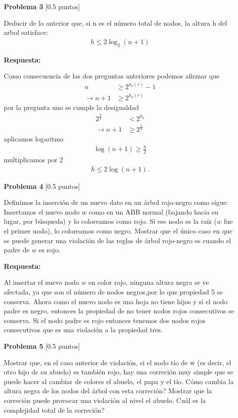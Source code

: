 \documentclass[11pt]{article}
\begin{document}
\begin{itemize}
 \item [\textbf{Problema 3}] [0.5 puntos]

Deducir de lo anterior que, si n es el número total de nodos, la altura h del arbol satisface:
\begin{align*}
h\leq2\log_2(n+1)
\end{align*}

\textbf{Respuesta:}

Como consecuencia de las dos preguntas anteriores podemos afirmar que
\begin{align*}
   n&\geq2^{h_b(r)}-1
  \\ \xrightarrow{}  n+1&\geq2^{h_b(r)}
\end{align*}
 por la pregunta uno se cumple la desigualdad
\begin{align*}
    2^{\frac{h}{2}}&<2^{h_b} 
   \\ \xrightarrow{} n+1&\geq 2^{\frac{h}{2}}
\end{align*}
aplicamos logaritmo
\begin{align*}
\log(n+1)\geq \frac{h}{2}
\end{align*}
multiplicamos por 2
\begin{align*}
h\leq 2 \log(n+1).
\end{align*}

\item [\textbf{Problema 4}] [0.5 puntos]

Definimos la inserción de un nuevo dato en un árbol rojo-negro como sigue: Insertamos el nuevo nodo
$w$ como en un ABB normal (bajando hacia su lugar, por búsqueda) y lo coloreamos como rojo. Si
ese nodo es la raíz ($w$ fue el primer nodo), lo coloreamos como negro. Mostrar que el único caso en
que se puede generar una violación de las reglas de árbol rojo-negro es cuando el padre de $w$ es rojo.

\textbf{Respuesta:}

Al insertar el nuevo nodo $w$ en color rojo, ninguna altura negra se ve afectada, ya que son el número de nodos negros,por lo que propiedad 5 se conserva. Ahora como el nuevo nodo es una hoja no tiene hijos y si el nodo padre es negro, entonces la propiedad de no tener nodos rojos consecutivos se conserva. Si el nodo padre es rojo entonces tenemos dos nodos rojos consecutivos que es una violación a la propiedad tres.

\item [\textbf{Problema 5}] [0.5 puntos]

 Mostrar que, en el caso anterior de violación, si el nodo tío de w (es decir, el otro hijo de su abuelo)
es también rojo, hay una correción muy simple que se puede hacer al cambiar de colores el abuelo, el
papa y el tío. Cómo cambia la altura negra de los nodos del árbol con esta correción? Mostrar que la
correción puede provocar una violación al nivel el abuelo. Cuál es la complejidad total de la correción?


\end{itemize}
\end{document}
